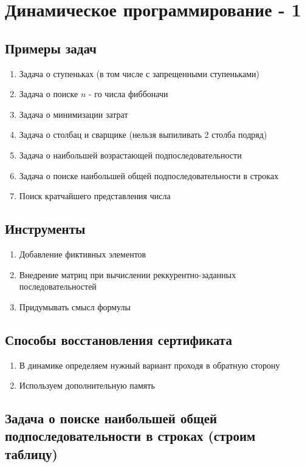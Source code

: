 \section{Динамическое программирование - 1}

\subsection{Примеры задач}

\begin{enumerate}
    \item Задача о ступеньках (в том числе с запрещенными ступеньками)
    \item Задача о поиске $n$ - го числа фиббоначи
    \item Задача о минимизации затрат
    \item Задача о столбац и сварщике (нельзя выпиливать 2 столба подряд)
    \item Задача о наибольшей возрастающей подпоследовательности
    \item Задача о поиске наибольшей общей подпоследовательности в строках
    \item Поиск кратчайшего представления числа
\end{enumerate}


\subsection{Инструменты}

\begin{enumerate}
    \item Добавление фиктивных элементов
    \item Внедрение матриц при вычислении реккурентно-заданных последовательностей
    \item Придумывать смысл формулы
\end{enumerate}


\subsection{Способы восстановления сертификата}

\begin{enumerate}
    \item В динамике определяем нужный вариант проходя в обратную сторону
    \item Используем дополнительную память
\end{enumerate}


\subsection{Задача о поиске наибольшей общей подпоследовательности в строках (строим таблицу)}

